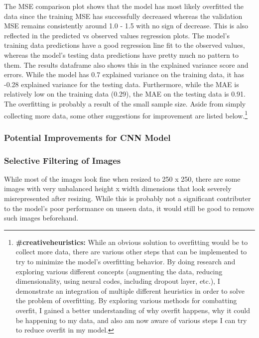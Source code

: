 \documentclass[11pt]{article}
\begin{document}
The MSE comparison plot shows that the model has most likely overfitted
the data since the training MSE has successfully decreased whereas the
validation MSE remains consistently around 1.0 - 1.5 with no sign of
decrease. This is also reflected in the predicted vs observed values
regression plots. The model's training data predictions have a good
regression line fit to the observed values, whereas the model's testing
data predictions have pretty much no pattern to them. The results
dataframe also shows this in the explained variance score and errors.
While the model has 0.7 explained variance on the training data, it has
-0.28 explained variance for the testing data. Furthermore, while the
MAE is relatively low on the training data (0.29), the MAE on the
testing data is 0.91.\\

The overfitting is probably a result of the small sample size. Aside
from simply collecting more data, some other suggestions for improvement
are listed below.\footnote{\textbf{\#creativeheuristics:} While an obvious solution to overfitting would be to collect more data, there are various other steps that can be implemented to try to minimize the model's overfitting behavior. By doing research and exploring various different concepts (augmenting the data, reducing dimensionality, using neural codes, including dropout layer, etc.), I demonstrate an integration of multiple different heuristics in order to solve the problem of overfitting. By exploring various methods for combatting overfit, I gained a better understanding of why overfit happens, why it could be happening to my data, and also am now aware of various steps I can try to reduce overfit in my model.}

\subsubsection{Potential Improvements for CNN Model}

\subsubsection*{Selective Filtering of Images}

While most of the images look fine when resized to 250 x 250, there are
some images with very unbalanced height x width dimensions that look
severely misrepresented after resizing. While this is probably not a
significant contributer to the model's poor performance on unseen data,
it would still be good to remove such images beforehand.
\end{document}

